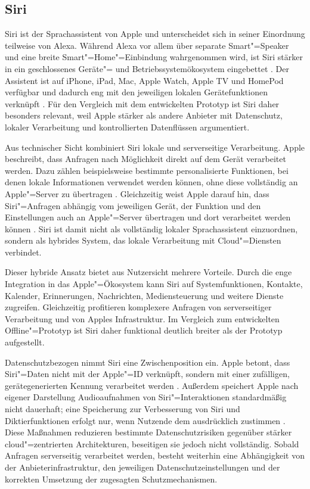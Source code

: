 \subsection{Siri}
\label{subsec:Siri}
Siri ist der Sprachassistent von Apple \autocite{Siri-Documentation} und unterscheidet sich in seiner Einordnung teilweise von Alexa. Während Alexa vor allem über separate Smart"=Speaker und eine breite Smart"=Home"=Einbindung wahrgenommen wird, ist Siri stärker in ein geschlossenes Geräte"= und Betriebssystemökosystem eingebettet \autocite{Siri-Documentation,Alexa-Documentation}. Der Assistent ist auf iPhone, iPad, Mac, Apple Watch, Apple TV und HomePod verfügbar und dadurch eng mit den jeweiligen lokalen Gerätefunktionen verknüpft \autocite{voiceassistantIntroduction}. Für den Vergleich mit dem entwickelten Prototyp ist Siri daher besonders relevant, weil Apple stärker als andere Anbieter mit Datenschutz, lokaler Verarbeitung und kontrollierten Datenflüssen argumentiert.

Aus technischer Sicht kombiniert Siri lokale und serverseitige Verarbeitung. Apple beschreibt, dass Anfragen nach Möglichkeit direkt auf dem Gerät verarbeitet werden. Dazu zählen beispielsweise bestimmte personalisierte Funktionen, bei denen lokale Informationen verwendet werden können, ohne diese vollständig an Apple"=Server zu übertragen \autocite{SiriPrivacyCommitment}. Gleichzeitig weist Apple darauf hin, dass Siri"=Anfragen abhängig vom jeweiligen Gerät, der Funktion und den Einstellungen auch an Apple"=Server übertragen und dort verarbeitet werden können \autocite{SiriDiktierfunktion}. Siri ist damit nicht als vollständig lokaler Sprachassistent einzuordnen, sondern als hybrides System, das lokale Verarbeitung mit Cloud"=Diensten verbindet.

Dieser hybride Ansatz bietet aus Nutzersicht mehrere Vorteile. Durch die enge Integration in das Apple"=Ökosystem kann Siri auf Systemfunktionen, Kontakte, Kalender, Erinnerungen, Nachrichten, Mediensteuerung und weitere Dienste zugreifen. Gleichzeitig profitieren komplexere Anfragen von serverseitiger Verarbeitung und von Apples Infrastruktur. Im Vergleich zum entwickelten Offline"=Prototyp ist Siri daher funktional deutlich breiter als der Prototyp aufgestellt.

Datenschutzbezogen nimmt Siri eine Zwischenposition ein. Apple betont, dass Siri"=Daten nicht mit der Apple"=ID verknüpft, sondern mit einer zufälligen, gerätegenerierten Kennung verarbeitet werden \autocite{SiriPrivacyCommitment}. Außerdem speichert Apple nach eigener Darstellung Audioaufnahmen von Siri"=Interaktionen standardmäßig nicht dauerhaft; eine Speicherung zur Verbesserung von Siri und Diktierfunktionen erfolgt nur, wenn Nutzende dem ausdrücklich zustimmen \autocite{SiriPrivacyCommitment}. Diese Maßnahmen reduzieren bestimmte Datenschutzrisiken gegenüber stärker cloud"=zentrierten Architekturen, beseitigen sie jedoch nicht vollständig. Sobald Anfragen serverseitig verarbeitet werden, besteht weiterhin eine Abhängigkeit von der Anbieterinfrastruktur, den jeweiligen Datenschutzeinstellungen und der korrekten Umsetzung der zugesagten Schutzmechanismen.

